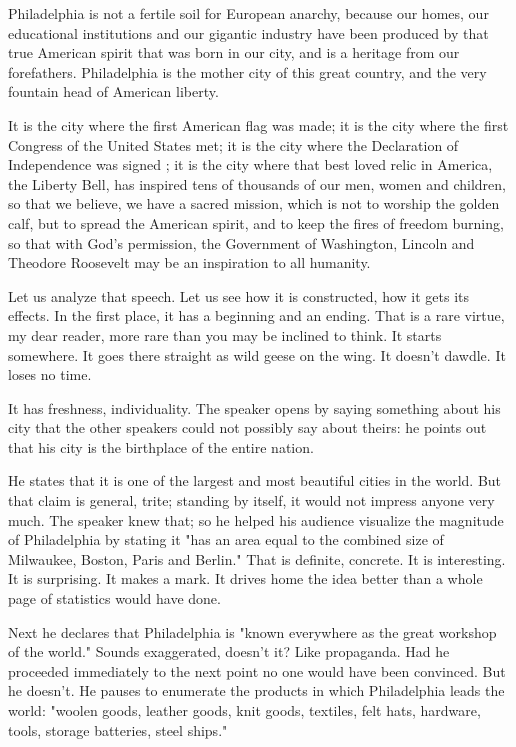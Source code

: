 \documentclass[10pt]{article}
\begin{document}
Philadelphia is not a fertile soil for European anarchy, because our homes, our educational institutions and our gigantic industry have been produced by that true American spirit that was born in our city, and is a heritage from our forefathers. Philadelphia is the mother city of this great country, and the very fountain head of American liberty.

It is the city where the first American flag was made; it is the city where the first Congress of the United States met; it is the city where the Declaration of Independence was signed ; it is the city where that best loved relic in America, the Liberty Bell, has inspired tens of thousands of our men, women and children, so that we believe, we have a sacred mission, which is not to worship the golden calf, but to spread the American spirit, and to keep the fires of freedom burning, so that with God's permission, the Government of Washington, Lincoln and Theodore Roosevelt may be an inspiration to all humanity.

Let us analyze that speech. Let us see how it is constructed, how it gets its effects. In the first place, it has a beginning and an ending. That is a rare virtue, my dear reader, more rare than you may be inclined to think. It starts somewhere. It goes there straight as wild geese on the wing. It doesn't dawdle. It loses no time.

It has freshness, individuality. The speaker opens by saying something about his city that the other speakers could not possibly say about theirs: he points out that his city is the birthplace of the entire nation.

He states that it is one of the largest and most beautiful cities in the world. But that claim is general, trite; standing by itself, it would not impress anyone very much. The speaker knew that; so he helped his audience visualize the magnitude of Philadelphia by stating it "has an area equal to the combined size of Milwaukee, Boston, Paris and Berlin." That is definite, concrete. It is interesting. It is surprising. It makes a mark. It drives home the idea better than a whole page of statistics would have done.

Next he declares that Philadelphia is "known everywhere as the great workshop of the world." Sounds exaggerated, doesn't it? Like propaganda. Had he proceeded immediately to the next point no one would have been convinced. But he doesn't. He pauses to enumerate the products in which Philadelphia leads the world: "woolen goods, leather goods, knit goods, textiles, felt hats, hardware, tools, storage batteries, steel ships."
\end{document}
